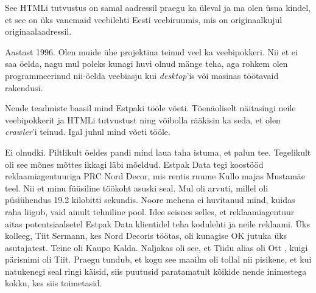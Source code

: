 
See HTMLi tutvustus on samal aadressil praegu ka üleval ja ma 
olen üsna kindel, et see on üks vanemaid veebilehti 
Eesti veebiruumis, mis on originaalkujul originaalaadressil. 


Aastast 1996. Olen muide ühe projektina teinud veel ka veebipokkeri. Nii et ei saa öelda, nagu mul poleks kunagi huvi olnud 
mänge teha, aga rohkem olen programmeerinud nii-öelda 
veebiasju kui \emph{desktop}'is või masinas töötavaid rakendusi. 

Nende teadmiste baasil mind Estpaki tööle võeti. Tõenäoliselt 
näitasingi neile veebipokkerit ja 
HTMLi tutvustust ning võibolla rääkisin ka seda, et olen 
\emph{crawler}'i teinud. Igal juhul mind võeti tööle.


Ei olnudki. Piltlikult öeldes pandi mind laua taha istuma, et palun tee. 
Tegelikult oli see mõnes mõttes ikkagi läbi mõeldud. Estpak Data tegi koostööd reklaamiagentuuriga PRC Nord Decor, mis rentis ruume Kullo majas 
Mustamäe teel. Nii et minu füüsiline töökoht asuski seal. Mul oli arvuti, millel oli püsiühendus 19.2 
kilobitti sekundis. Noore mehena ei huvitanud mind, kuidas raha liigub, vaid ainult 
tehniline pool. Idee seisnes selles, et reklaamiagentuur aitas 
potentsiaalsetel Estpak Data klientidel teha kodulehti ja neile 
reklaami. Üks kolleeg, Tiit Sermann, kes Nord Decoris töötas, oli kunagise 
OK jutuka üks asutajatest. Teine oli
Kaupo Kalda. Naljakas oli see, et Tiidu alias oli Ott , kuigi
pärisnimi oli Tiit. Praegu tundub, et kogu see 
maailm oli tollal nii pisikene, et kui natukenegi seal ringi 
käisid, siis puutusid paratamatult kõikide nende inimestega kokku, 
kes siis toimetasid.

